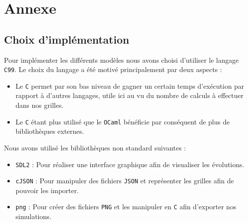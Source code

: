 \documentclass[12pt]{article}
\begin{document}
\section{Annexe}

\subsection{Choix d'implémentation}

Pour implémenter les différents modèles nous avons choisi d'utiliser le langage \texttt{C99}. Le choix du langage a été motivé principalement par deux aspects :

\begin{itemize}
    \item Le \texttt{C} permet par son bas niveau de gagner un certain temps d'exécution par rapport à d'autres langages, utile ici au vu du nombre de calculs à effectuer dans nos grilles.
    \item Le \texttt{C} étant plus utilisé que le \texttt{OCaml} bénéficie par conséquent de plus de bibliothèques externes.
\end{itemize}

Nous avons utilisé les bibliothèques non standard suivantes :

\begin{itemize}
    \item \texttt{SDL2} : Pour réaliser une interface graphique afin de visualiser les évolutions.
    \item \texttt{cJSON} : Pour manipuler des fichiers \texttt{JSON} et représenter les grilles afin de pouvoir les importer.
    \item \texttt{png} : Pour créer des fichiers \texttt{PNG} et les manipuler en \texttt{C} afin d'exporter nos simulations.
\end{itemize}
\end{document}
